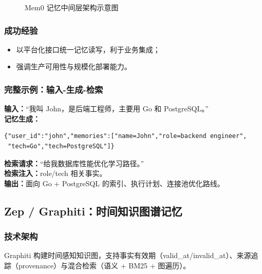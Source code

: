 \documentclass[12pt,a4paper]{article}
\begin{document}
\begin{figure}[H]
\centering
{}
\caption{Mem0 记忆中间层架构示意图}
\label{fig:mem0}
\end{figure}

\subsubsection{成功经验}
\begin{itemize}[leftmargin=2em]
  \item 以平台化接口统一记忆读写，利于业务集成；
  \item 强调生产可用性与规模化部署能力\cite{mem02025}。
\end{itemize}

\subsubsection{完整示例：输入-生成-检索}
\textbf{输入：}“我叫 John，是后端工程师，主要用 Go 和 PostgreSQL。”\\
\textbf{记忆生成：}
\begin{verbatim}
{"user_id":"john","memories":["name=John","role=backend engineer",
 "tech=Go","tech=PostgreSQL"]}
\end{verbatim}
\textbf{检索请求：}“给我数据库性能优化学习路径。”\\
\textbf{检索注入：}role/tech 相关事实。\\
\textbf{输出：}面向 Go + PostgreSQL 的索引、执行计划、连接池优化路线。

\subsection{Zep / Graphiti：时间知识图谱记忆}
\subsubsection{技术架构}
Graphiti 构建时间感知知识图，支持事实有效期（valid\_at/invalid\_at）、来源追踪（provenance）与混合检索（语义 + BM25 + 图遍历）\cite{zep2025,graphiti2024}。
\end{document}
